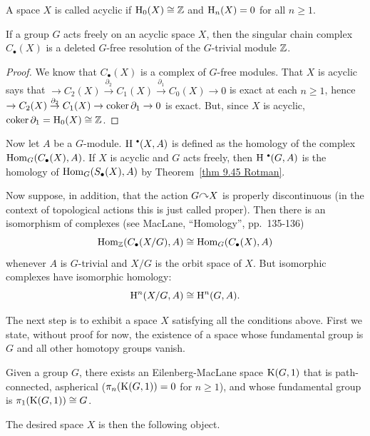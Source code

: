 \begin{defn}
    A space $X$ is called acyclic if $\mathrm{H}_0(X)\cong \mathbb{Z}$ and $\mathrm{H}_n(X)=0$ for all $n\geq 1$.
\end{defn}

\begin{thm}\label{thm 9.45 Rotman}
    If a group $G$ acts freely on an acyclic space $X$, then the singular chain complex $C_\bullet(X)$ is a deleted $G$-free resolution of the $G$-trivial module $\mathbb{Z}$.
\end{thm}
\begin{proof}
    We know that $C_\bullet(X)$ is a complex of $G$-free modules. That $X$ is acyclic says that $\to C_2(X)\overset{\partial_2}{\to}C_1(X)\overset{\partial_1}{\to}C_0(X)\to 0$ is exact at each $n\geq 1$, hence $\to C_2(X)\overset{\partial_2}{\to}C_1(X)\to \operatorname{coker} \partial_1\to 0$ is exact. But, since $X$ is acyclic, $\operatorname{coker} \partial_1=\mathrm{H}_0(X)\cong \mathbb{Z}$.
\end{proof}

Now let $A$ be a $G$-module. $\rmH^{\smbullet }(X,A)$ is defined as the homology of the complex $\operatorname{Hom}_G(C_\bullet(X),A)$. If $X$ is acyclic and $G$ acts freely, then $\rmH^{\smbullet }(G,A)$ is the homology of $\operatorname{Hom}_G(S_\bullet(X),A)$ by Theorem~\ref{thm 9.45 Rotman}. 

Now suppose, in addition, that the action $G\acts X$ is properly discontinuous (in the context of topological actions this is just called proper). Then there is an isomorphism of complexes (see MacLane, ``Homology'', pp.~135-136)
\[\operatorname{Hom}_{\mathbb{Z}}(C_\bullet(X\slash G),A)\cong \operatorname{Hom}_G(C_\bullet(X),A)\]
whenever $A$ is $G$-trivial and $X\slash G$ is the orbit space of $X$. But isomorphic complexes have isomorphic homology:
\[\mathrm{H}^n(X\slash G,A)\cong \mathrm{H}^n(G,A).\label{eq 2 rotman}\]

The next step is to exhibit a space $X$ satisfying all the conditions above. First we state, without proof for now, the existence of a space whose fundamental group is $G$ and all other homotopy groups vanish.

\begin{defn}
    Given a group $G$, there exists an Eilenberg-MacLane space $\mathrm{K}(G,1)$ that is path-connected, aspherical ($\pi_n(\mathrm{K}(G,1))=0$ for $n\geq 1$), and whose fundamental group is $\pi_1(\mathrm{K}(G,1))\cong G$.
\end{defn}

The desired space $X$ is then the following object.

